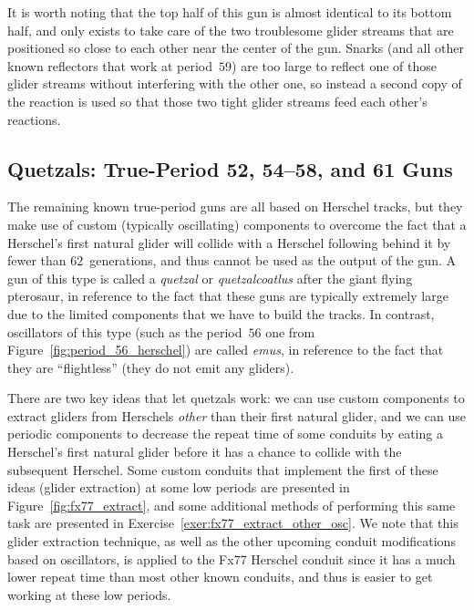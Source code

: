 It is worth noting that the top half of this gun is almost identical to its bottom half, and only exists to take care of the two troublesome glider streams that are positioned so close to each other near the center of the gun. Snarks (and all other known reflectors that work at period~$59$) are too large to reflect one of those glider streams without interfering with the other one, so instead a second copy of the reaction is used so that those two tight glider streams feed each other's reactions.


\subsection{Quetzals: True-Period 52, 54--58, and 61 Guns}\label{sec:true_period_guns_p57}

The remaining known true-period guns are all based on Herschel tracks, but they make use of custom (typically oscillating) components to overcome the fact that a Herschel's first natural glider will collide with a Herschel following behind it by fewer than $62$~generations, and thus cannot be used as the output of the gun. A gun of this type is called a \emph{quetzal} or \emph{quetzalcoatlus} after the giant flying pterosaur, in reference to the fact that these guns are typically extremely large due to the limited components that we have to build the tracks. In contrast, oscillators of this type (such as the period~$56$ one from Figure~\ref{fig:period_56_herschel}) are called \emph{emus}, in reference to the fact that they are ``flightless'' (they do not emit any gliders).

There are two key ideas that let quetzals work: we can use custom components to extract gliders from Herschels \emph{other} than their first natural glider, and we can use periodic components to decrease the repeat time of some conduits by eating a Herschel's first natural glider before it has a chance to collide with the subsequent Herschel. Some custom conduits that implement the first of these ideas (glider extraction) at some low periods are presented in Figure~\ref{fig:fx77_extract}, and some additional methods of performing this same task are presented in Exercise~\ref{exer:fx77_extract_other_osc}. We note that this glider extraction technique, as well as the other upcoming conduit modifications based on oscillators, is applied to the Fx77 Herschel conduit since it has a much lower repeat time than most other known conduits, and thus is easier to get working at these low periods.

